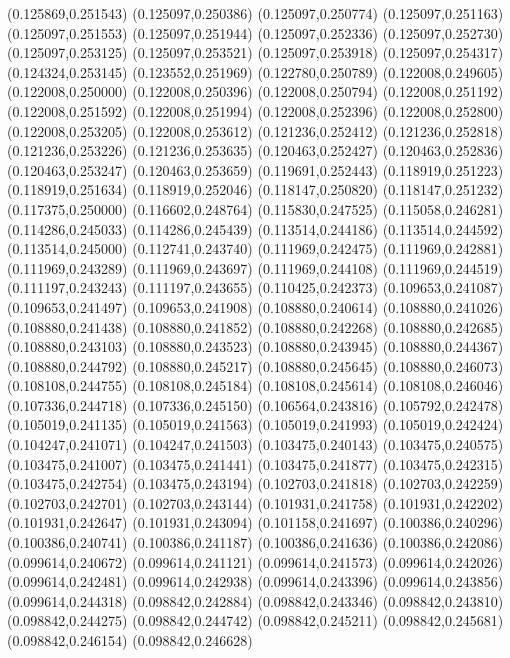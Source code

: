 (0.125869,0.251543)
(0.125097,0.250386)
(0.125097,0.250774)
(0.125097,0.251163)
(0.125097,0.251553)
(0.125097,0.251944)
(0.125097,0.252336)
(0.125097,0.252730)
(0.125097,0.253125)
(0.125097,0.253521)
(0.125097,0.253918)
(0.125097,0.254317)
(0.124324,0.253145)
(0.123552,0.251969)
(0.122780,0.250789)
(0.122008,0.249605)
(0.122008,0.250000)
(0.122008,0.250396)
(0.122008,0.250794)
(0.122008,0.251192)
(0.122008,0.251592)
(0.122008,0.251994)
(0.122008,0.252396)
(0.122008,0.252800)
(0.122008,0.253205)
(0.122008,0.253612)
(0.121236,0.252412)
(0.121236,0.252818)
(0.121236,0.253226)
(0.121236,0.253635)
(0.120463,0.252427)
(0.120463,0.252836)
(0.120463,0.253247)
(0.120463,0.253659)
(0.119691,0.252443)
(0.118919,0.251223)
(0.118919,0.251634)
(0.118919,0.252046)
(0.118147,0.250820)
(0.118147,0.251232)
(0.117375,0.250000)
(0.116602,0.248764)
(0.115830,0.247525)
(0.115058,0.246281)
(0.114286,0.245033)
(0.114286,0.245439)
(0.113514,0.244186)
(0.113514,0.244592)
(0.113514,0.245000)
(0.112741,0.243740)
(0.111969,0.242475)
(0.111969,0.242881)
(0.111969,0.243289)
(0.111969,0.243697)
(0.111969,0.244108)
(0.111969,0.244519)
(0.111197,0.243243)
(0.111197,0.243655)
(0.110425,0.242373)
(0.109653,0.241087)
(0.109653,0.241497)
(0.109653,0.241908)
(0.108880,0.240614)
(0.108880,0.241026)
(0.108880,0.241438)
(0.108880,0.241852)
(0.108880,0.242268)
(0.108880,0.242685)
(0.108880,0.243103)
(0.108880,0.243523)
(0.108880,0.243945)
(0.108880,0.244367)
(0.108880,0.244792)
(0.108880,0.245217)
(0.108880,0.245645)
(0.108880,0.246073)
(0.108108,0.244755)
(0.108108,0.245184)
(0.108108,0.245614)
(0.108108,0.246046)
(0.107336,0.244718)
(0.107336,0.245150)
(0.106564,0.243816)
(0.105792,0.242478)
(0.105019,0.241135)
(0.105019,0.241563)
(0.105019,0.241993)
(0.105019,0.242424)
(0.104247,0.241071)
(0.104247,0.241503)
(0.103475,0.240143)
(0.103475,0.240575)
(0.103475,0.241007)
(0.103475,0.241441)
(0.103475,0.241877)
(0.103475,0.242315)
(0.103475,0.242754)
(0.103475,0.243194)
(0.102703,0.241818)
(0.102703,0.242259)
(0.102703,0.242701)
(0.102703,0.243144)
(0.101931,0.241758)
(0.101931,0.242202)
(0.101931,0.242647)
(0.101931,0.243094)
(0.101158,0.241697)
(0.100386,0.240296)
(0.100386,0.240741)
(0.100386,0.241187)
(0.100386,0.241636)
(0.100386,0.242086)
(0.099614,0.240672)
(0.099614,0.241121)
(0.099614,0.241573)
(0.099614,0.242026)
(0.099614,0.242481)
(0.099614,0.242938)
(0.099614,0.243396)
(0.099614,0.243856)
(0.099614,0.244318)
(0.098842,0.242884)
(0.098842,0.243346)
(0.098842,0.243810)
(0.098842,0.244275)
(0.098842,0.244742)
(0.098842,0.245211)
(0.098842,0.245681)
(0.098842,0.246154)
(0.098842,0.246628)
